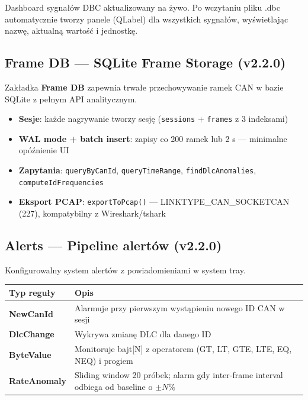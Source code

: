 \documentclass[a4paper,12pt]{article}
\begin{document}
Dashboard sygnałów DBC aktualizowany na żywo. Po wczytaniu pliku .dbc automatycznie tworzy panele (QLabel) dla wszystkich sygnałów, wyświetlając nazwę, aktualną wartość i jednostkę.

\subsection{Frame DB --- SQLite Frame Storage \textnormal{\color{pink}(v2.2.0)}}

Zakładka \textbf{Frame DB} zapewnia trwałe przechowywanie ramek CAN w bazie SQLite z pełnym API analitycznym.

\begin{itemize}[nosep]
    \item \textbf{Sesje}: każde nagrywanie tworzy sesję (\texttt{sessions} + \texttt{frames} z 3 indeksami)
    \item \textbf{WAL mode + batch insert}: zapisy co 200 ramek lub 2 s — minimalne opóźnienie UI
    \item \textbf{Zapytania}: \texttt{queryByCanId}, \texttt{queryTimeRange}, \texttt{findDlcAnomalies}, \texttt{computeIdFrequencies}
    \item \textbf{Eksport PCAP}: \texttt{exportToPcap()} — LINKTYPE\_CAN\_SOCKETCAN (227), kompatybilny z Wireshark/tshark
\end{itemize}

\subsection{Alerts --- Pipeline alertów \textnormal{\color{pink}(v2.2.0)}}

Konfigurowalny system alertów z powiadomieniami w system tray.

\begin{center}
\begin{tabularx}{0.95\textwidth}{@{}>{\color{accent}\bfseries\ttfamily}lX@{}}
\toprule
\rowcolor{darkbg} Typ reguły & Opis \\
\midrule
NewCanId   & Alarmuje przy pierwszym wystąpieniu nowego ID CAN w sesji \\
DlcChange  & Wykrywa zmianę DLC dla danego ID \\
ByteValue  & Monitoruje bajt[N] z operatorem (GT, LT, GTE, LTE, EQ, NEQ) i progiem \\
RateAnomaly & Sliding window 20 próbek; alarm gdy inter-frame interval odbiega od baseline o $\pm N\%$ \\
\bottomrule
\end{tabularx}
\end{center}
\end{document}
